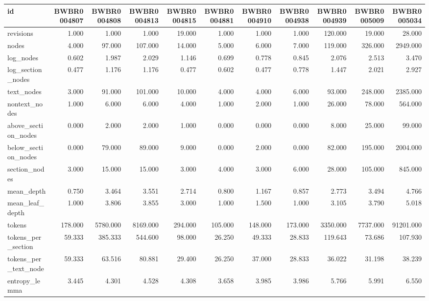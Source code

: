 \begin{tabular}{lrrrrrrrrrr}
\toprule
id & BWBR0004807 & BWBR0004808 & BWBR0004813 & BWBR0004815 & BWBR0004881 & BWBR0004910 & BWBR0004938 & BWBR0004939 & BWBR0005009 & BWBR0005034 \\
\midrule
revisions & 1.000 & 1.000 & 1.000 & 19.000 & 1.000 & 1.000 & 1.000 & 120.000 & 19.000 & 28.000 \\
\cline{1-11}
nodes & 4.000 & 97.000 & 107.000 & 14.000 & 5.000 & 6.000 & 7.000 & 119.000 & 326.000 & 2949.000 \\
\cline{1-11}
log\_nodes & 0.602 & 1.987 & 2.029 & 1.146 & 0.699 & 0.778 & 0.845 & 2.076 & 2.513 & 3.470 \\
\cline{1-11}
log\_section\_nodes & 0.477 & 1.176 & 1.176 & 0.477 & 0.602 & 0.477 & 0.778 & 1.447 & 2.021 & 2.927 \\
\cline{1-11}
text\_nodes & 3.000 & 91.000 & 101.000 & 10.000 & 4.000 & 4.000 & 6.000 & 93.000 & 248.000 & 2385.000 \\
\cline{1-11}
nontext\_nodes & 1.000 & 6.000 & 6.000 & 4.000 & 1.000 & 2.000 & 1.000 & 26.000 & 78.000 & 564.000 \\
\cline{1-11}
above\_section\_nodes & 0.000 & 2.000 & 2.000 & 1.000 & 0.000 & 0.000 & 0.000 & 8.000 & 25.000 & 99.000 \\
\cline{1-11}
below\_section\_nodes & 0.000 & 79.000 & 89.000 & 9.000 & 0.000 & 2.000 & 0.000 & 82.000 & 195.000 & 2004.000 \\
\cline{1-11}
section\_nodes & 3.000 & 15.000 & 15.000 & 3.000 & 4.000 & 3.000 & 6.000 & 28.000 & 105.000 & 845.000 \\
\cline{1-11}
mean\_depth & 0.750 & 3.464 & 3.551 & 2.714 & 0.800 & 1.167 & 0.857 & 2.773 & 3.494 & 4.766 \\
\cline{1-11}
mean\_leaf\_depth & 1.000 & 3.806 & 3.855 & 3.000 & 1.000 & 1.500 & 1.000 & 3.105 & 3.790 & 5.018 \\
\cline{1-11}
tokens & 178.000 & 5780.000 & 8169.000 & 294.000 & 105.000 & 148.000 & 173.000 & 3350.000 & 7737.000 & 91201.000 \\
\cline{1-11}
tokens\_per\_section & 59.333 & 385.333 & 544.600 & 98.000 & 26.250 & 49.333 & 28.833 & 119.643 & 73.686 & 107.930 \\
\cline{1-11}
tokens\_per\_text\_node & 59.333 & 63.516 & 80.881 & 29.400 & 26.250 & 37.000 & 28.833 & 36.022 & 31.198 & 38.239 \\
\cline{1-11}
entropy\_lemma & 3.445 & 4.301 & 4.528 & 4.308 & 3.658 & 3.985 & 3.986 & 5.766 & 5.991 & 6.550 \\

\end{tabular}
